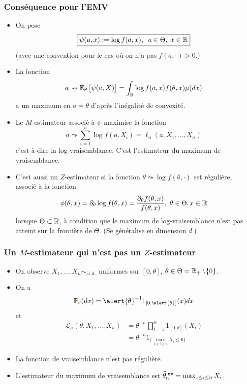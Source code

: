 \begin{frame}
\frametitle{Conséquence pour l'EMV}
\begin{itemize}
\item On pose
$$\boxed{\psi(a,x):=\log f(a,x),\;\;a \in \Theta,\;x\in\operatorname{{\mathbb R}}}$$
(avec une convention pour le cas où on n'a pas $f(a,\cdot) >0$.)
\item La fonction
$$a \leadsto \operatorname{{\mathbb E}}_\theta \big[\psi(a,X)\big]=\int_{\operatorname{{\mathbb R}}}\log f(a,x) f(\theta,x) \mu(dx)$$
a un maximum en $a=\theta$ d'après \alert{l'inégalité de convexité}.
\end{itemize}
\end{frame}

\begin{frame}
\begin{itemize}
\item Le $M$-estimateur associé à $\psi$ maximise la fonction
$$a \leadsto \sum_{i = 1}^n \log f(a, X_i) = \ell_n(a, X_1,\ldots, X_n)$$
c'est-à-dire la \alert{ log-vraisemblance}. C'est \alert{l'estimateur du maximum de vraisemblance}.

\item C'est aussi un $Z$-estimateur si la fonction $\theta \leadsto \log f(\theta, \cdot)$ est régulière, associé à la fonction
$$\phi(\theta, x) = \partial_\theta \log f(\theta, x) = \frac{\partial_\theta f(\theta, x)}{f(\theta, x)},\;\theta \in \Theta, x\in \operatorname{{\mathbb R}}$$
lorsque $\Theta \subset \operatorname{{\mathbb R}}$, \`a condition que le maximum de
log-vraisemblance n'est pas atteint sur la fronti\`ere de $\Theta$.
(Se généralise en dimension $d$.)
\end{itemize}
\end{frame}

\begin{frame}
\frametitle{Un $M$-estimateur qui n'est pas un $Z$-estimateur}
\begin{itemize}
\item On observe $X_1,\ldots, X_n\sim_{\text{i.i.d}.}$ uniformes sur $[0,\theta]$, $\theta \in \Theta = \operatorname{{\mathbb R}}_+\setminus \{0\}$.
\item On a $$\PP_{\tco{\theta}}(dx) = \alert{\theta}^{-1}1_{[0,\alert{\theta}]}(x)dx$$
et
\begin{align*}
{\mathcal L}_n(\theta, X_1,\ldots, X_n)& = \theta^{-n}\prod_{i = 1}^n 1_{[0,\theta]}(X_i) \\
& = \theta^{-n}1_{\{\max_{1 \leq i \leq n} X_i \leq \theta\}}
\end{align*}
\item La fonction de vraisemblance \alert{n'est pas régulière}.
\item \alert{L'estimateur du maximum de vraisemblance est}
$\operatorname{\widehat \theta_n^{\,\,{\tt mv}}} = \max_{1 \leq i \leq n}X_i$. %
\end{itemize}
\end{frame}


